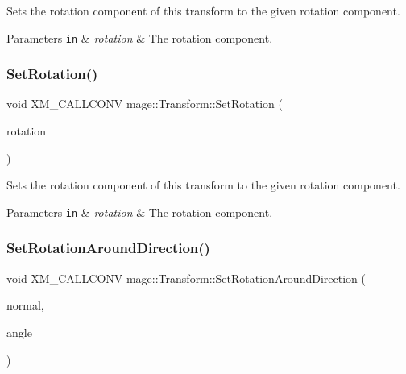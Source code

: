 Sets the rotation component of this transform to the given rotation component.


\begin{DoxyParams}[1]{Parameters}
\mbox{\tt in}  & {\em rotation} & The rotation component. \\
\hline
\end{DoxyParams}
\hypertarget{classmage_1_1_transform_a66ddc77bfbbf0b66e00d5ec8e10d1d65}{}\label{classmage_1_1_transform_a66ddc77bfbbf0b66e00d5ec8e10d1d65} 
\subsubsection{\texorpdfstring{Set\+Rotation()}{SetRotation()}\hspace{0.1cm}{\footnotesize\ttfamily [3/3]}}
{\footnotesize\ttfamily void X\+M\+\_\+\+C\+A\+L\+L\+C\+O\+NV mage\+::\+Transform\+::\+Set\+Rotation (\begin{DoxyParamCaption}\item[{F\+X\+M\+V\+E\+C\+T\+OR}]{rotation }\end{DoxyParamCaption})\hspace{0.3cm}{\ttfamily [noexcept]}}

Sets the rotation component of this transform to the given rotation component.


\begin{DoxyParams}[1]{Parameters}
\mbox{\tt in}  & {\em rotation} & The rotation component. \\
\hline
\end{DoxyParams}
\hypertarget{classmage_1_1_transform_a8d829e3aeef9a2a529ceb405b7b36c64}{}\label{classmage_1_1_transform_a8d829e3aeef9a2a529ceb405b7b36c64} 
\subsubsection{\texorpdfstring{Set\+Rotation\+Around\+Direction()}{SetRotationAroundDirection()}}
{\footnotesize\ttfamily void X\+M\+\_\+\+C\+A\+L\+L\+C\+O\+NV mage\+::\+Transform\+::\+Set\+Rotation\+Around\+Direction (\begin{DoxyParamCaption}\item[{F\+X\+M\+V\+E\+C\+T\+OR}]{normal,  }\item[{\hyperlink{namespacemage_aa97e833b45f06d60a0a9c4fc22ae02c0}{F32}}]{angle }\end{DoxyParamCaption})\hspace{0.3cm}{\ttfamily [noexcept]}}

